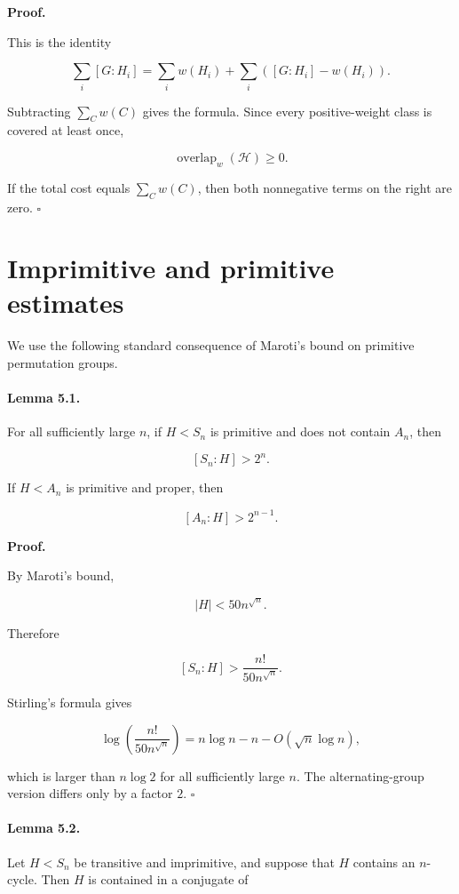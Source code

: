 \documentclass[11pt]{article}
\begin{document}
\noindent\textbf{Proof.}

This is the identity

\[
\sum_i [G:H_i]
=
\sum_i w(H_i)+\sum_i([G:H_i]-w(H_i)).
\]

Subtracting $\sum_Cw(C)$ gives the formula. Since every positive-weight class is covered at least once,

\[
\operatorname{overlap}_w(\mathcal H)\ge0.
\]

If the total cost equals $\sum_Cw(C)$, then both nonnegative terms on the right are zero. $\square$

\section{Imprimitive and primitive estimates}

We use the following standard consequence of Maroti's bound on primitive permutation groups.

\paragraph{Lemma 5.1.}

For all sufficiently large $n$, if $H<S_n$ is primitive and does not contain $A_n$, then

\[
[S_n:H]>2^n.
\]

If $H<A_n$ is primitive and proper, then

\[
[A_n:H]>2^{n-1}.
\]

\noindent\textbf{Proof.}

By Maroti's bound,

\[
|H|<50n^{\sqrt n}.
\]

Therefore

\[
[S_n:H]>\frac{n!}{50n^{\sqrt n}}.
\]

Stirling's formula gives

\[
\log\left(\frac{n!}{50n^{\sqrt n}}\right)
=
n\log n-n-O(\sqrt n\log n),
\]

which is larger than $n\log2$ for all sufficiently large $n$. The alternating-group version differs only by a factor $2$. $\square$

\paragraph{Lemma 5.2.}

Let $H<S_n$ be transitive and imprimitive, and suppose that $H$ contains an $n$-cycle. Then $H$ is contained in a conjugate of
\end{document}
